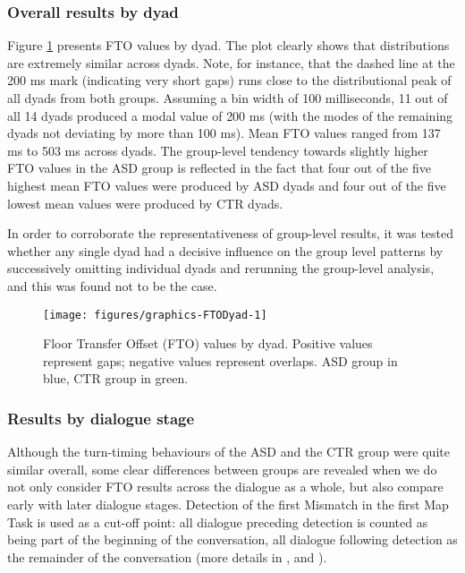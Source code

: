 \subsubsection{Overall results by dyad}\label{sec:turntaking_results_FTO_dyad}


Figure \ref{fig:FTODyad} presents FTO values by dyad. The plot clearly shows that distributions are extremely similar across dyads. Note, for instance, that the dashed line at the 200 ms mark (indicating very short gaps) runs close to the distributional peak of all dyads from both groups.
Assuming a bin width of 100 milliseconds, 11 out of all 14 dyads produced a modal value of 200 ms (with the modes of the remaining dyads not deviating by more than 100 ms).
Mean FTO values ranged from 137 ms to 503 ms across dyads. The group-level tendency towards slightly higher FTO values in the ASD group is reflected in the fact that four out of the five highest mean FTO values were produced by ASD dyads and four out of the five lowest mean values were produced by CTR dyads.

In order to corroborate the representativeness of group-level results, it was tested whether any single dyad had a decisive influence on the group level patterns by successively omitting individual dyads and rerunning the group-level analysis, and this was found not to be the case.



\begin{figure}

{\centering \texttt{[image: figures/graphics-FTODyad-1]} 
	
}

\caption{Floor Transfer Offset (FTO) values by dyad. Positive values represent gaps; negative values represent overlaps. ASD group in blue, CTR group in green.}\label{fig:FTODyad}
\end{figure}


\subsubsection{Results by dialogue stage}\label{turntaking_results_FTO_group_stage}

Although the turn-timing behaviours of the ASD and the CTR group were quite similar overall, some clear differences between groups are revealed when we do not only consider FTO results across the dialogue as a whole, but also compare early with later dialogue stages. Detection of the first Mismatch in the first Map Task is used as a cut-off point: all dialogue preceding detection is counted as being part of the beginning of the conversation, all dialogue following detection as the remainder of the conversation (more details in ,  and ).


